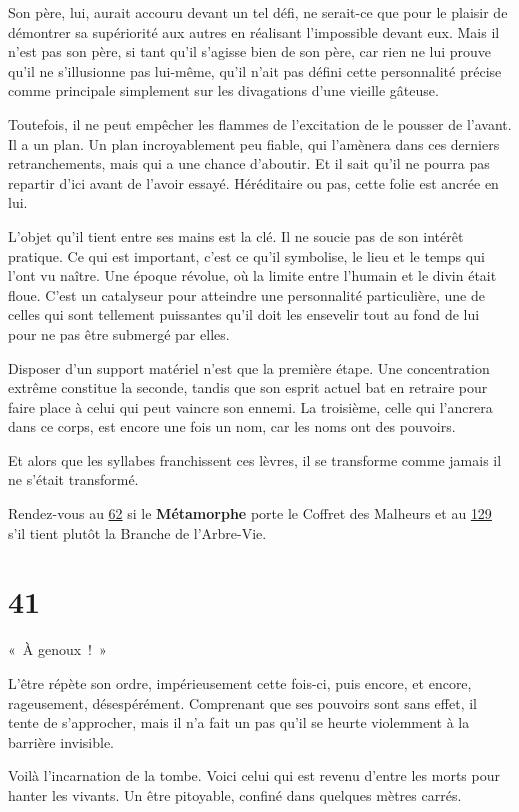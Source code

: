 \documentclass{report}
\newcommand{\gsection}[1]{
    \section{#1}
    \label{section-#1}
}
\newcommand{\glink}[1]{\hyperref[section-#1]{#1}}
\newcommand{\hero}[1]{\textbf{#1}}
\begin{document}
Son père, lui, aurait accouru devant un tel défi, ne serait-ce que pour le plaisir de démontrer sa supériorité aux autres en réalisant l'impossible devant eux. Mais il n'est pas son père, si tant qu'il s'agisse bien de son père, car rien ne lui prouve qu'il ne s'illusionne pas lui-même, qu'il n'ait pas défini cette personnalité précise comme principale simplement sur les divagations d'une vieille gâteuse.

Toutefois, il ne peut empêcher les flammes de l'excitation de le pousser de l'avant. Il a un plan. Un plan incroyablement peu fiable, qui l'amènera dans ces derniers retranchements, mais qui a une chance d'aboutir. Et il sait qu'il ne pourra pas repartir d'ici avant de l'avoir essayé. Héréditaire ou pas, cette folie est ancrée en lui.

L'objet qu'il tient entre ses mains est la clé. Il ne soucie pas de son intérêt pratique. Ce qui est important, c'est ce qu'il symbolise, le lieu et le temps qui l'ont vu naître. Une époque révolue, où la limite entre l'humain et le divin était floue. C'est un catalyseur pour atteindre une personnalité particulière, une de celles qui sont tellement puissantes qu'il doit les ensevelir tout au fond de lui pour ne pas être submergé par elles.

Disposer d'un support matériel n'est que la première étape. Une concentration extrême constitue la seconde, tandis que son esprit actuel bat en retraire pour faire place à celui qui peut vaincre son ennemi. La troisième, celle qui l'ancrera dans ce corps, est encore une fois un nom, car les noms ont des pouvoirs.

Et alors que les syllabes franchissent ces lèvres, il se transforme comme jamais il ne s'était transformé.

Rendez-vous au \glink{62} si le \hero{Métamorphe} porte le Coffret des Malheurs et au \glink{129} s'il tient plutôt la Branche de l'Arbre-Vie.

\gsection{41}

« À genoux ! »

L'être répète son ordre, impérieusement cette fois-ci, puis encore, et encore, rageusement, désespérément. Comprenant que ses pouvoirs sont sans effet, il tente de s'approcher, mais il n'a fait un pas qu'il se heurte violemment à la barrière invisible.

Voilà l'incarnation de la tombe. Voici celui qui est revenu d'entre les morts pour hanter les vivants. Un être pitoyable, confiné dans quelques mètres carrés.
\end{document}
